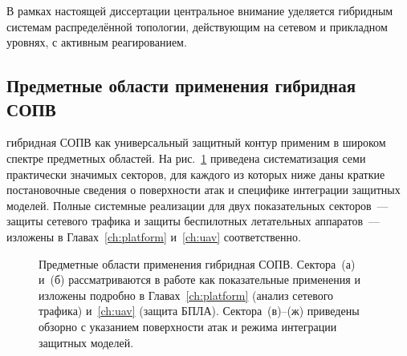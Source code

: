 В рамках настоящей диссертации центральное внимание уделяется
гибридным системам распределённой топологии, действующим на сетевом
и прикладном уровнях, с активным реагированием.

\subsection{Предметные области применения гибридная СОПВ}
\label{subsec:idps_sectors}

гибридная СОПВ как универсальный защитный контур применим в широком
спектре предметных областей. На рис.~\ref{fig:orga_apps_idps}
приведена систематизация семи практически значимых секторов, для
каждого из которых ниже даны краткие постановочные сведения о
поверхности атак и специфике интеграции защитных моделей. Полные
системные реализации для двух показательных секторов~--- защиты
сетевого трафика и защиты беспилотных летательных аппаратов~---
изложены в Главах~\ref{ch:platform} и~\ref{ch:uav} соответственно.

\begin{figure}[htbp]
\centering
{}
\caption{Предметные области применения гибридная СОПВ. Сектора~(а) и~(б)
рассматриваются в работе как показательные применения и
изложены подробно в Главах~\ref{ch:platform} (анализ сетевого
трафика) и~\ref{ch:uav} (защита БПЛА). Сектора~(в)--(ж) приведены
обзорно с указанием поверхности атак и режима интеграции защитных
моделей.}
\label{fig:orga_apps_idps}
\end{figure}

